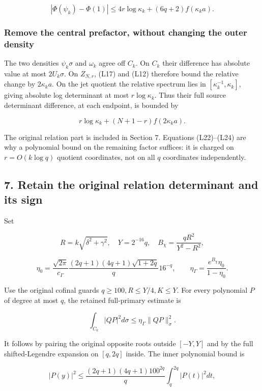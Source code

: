 \[
|\Phi(\psi_k)-\Phi(1)|
\le4r\log\kappa_k+(6q+2)f(\kappa_k a).
\tag{L23}
\]

\subsubsection{Remove the central prefactor, without changing the outer density}\label{loc:remove-the-central-prefactor-without-changing-the-outer-density}

The two densities \(\psi_k\sigma\) and \(\omega_k\) agree off \(C_k\). On \(C_k\) their difference has absolute value at most \(2U_k\sigma\). On \(Z_{N,r}\), (L17) and (L12) therefore bound the relative change by \(2\kappa_k a\). On the jet quotient the relative spectrum lies in \([\kappa_k^{-1},\kappa_k]\), giving absolute log determinant at most \(r\log\kappa_k\). Thus their full source determinant difference, at each endpoint, is bounded by

\[
r\log\kappa_k+(N+1-r)f(2\kappa_k a).
\tag{L24}
\]

The original relation part is included in Section 7. Equations (L22)--(L24) are why a polynomial bound on the remaining factor suffices: it is charged on \(r=O(k\log q)\) quotient coordinates, not on all \(q\) coordinates independently.

\subsection{7. Retain the original relation determinant and its sign}\label{loc:retain-the-original-relation-determinant-and-its-sign}

Set

\[
R=k\sqrt{\delta^2+\gamma^2},\quad Y=2^{-16}q,\quad
B_\chi=\frac{qR^2}{Y^2-R^2},
\]

\[
\eta_0=\frac{\sqrt{2\pi}}{c_\Gamma}
\frac{(2q+1)(4q+1)\sqrt{1+2q}}q16^{-q},\qquad
\eta_\Gamma=\frac{e^{B_\chi}\eta_0}{1-\eta_0}.
\tag{L25}
\]

Use the original cofinal guards \(q\ge100,R\le Y/4,K\le Y\). For every polynomial \(P\) of degree at most \(q\), the retained full-primary estimate is

\[
\int_{C_k}|QP|^2d\sigma\le\eta_\Gamma\|QP\|_\sigma^2.
\tag{L26}
\]

It follows by pairing the original opposite roots outside \([-Y,Y]\) and by the full shifted-Legendre expansion on \([q,2q]\) inside. The inner polynomial bound is

\[
|P(y)|^2\le\frac{(2q+1)(4q+1)100^{2q}}q
\int_q^{2q}|P(t)|^2dt,
\]

